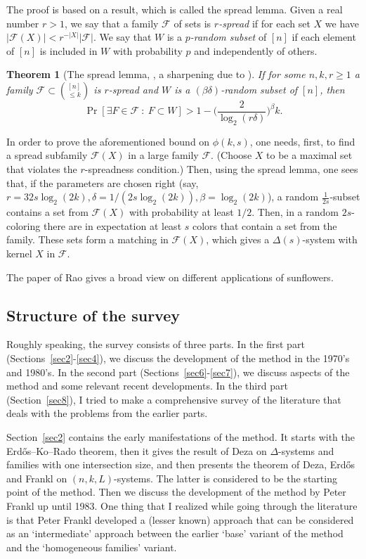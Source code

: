 \documentclass[graybox]{svmult}
\renewcommand{\le}{\leqslant}
\renewcommand{\ge}{\geqslant}
\newcommand{\ff}{\mathcal{F}}
\newtheorem{thm}{Theorem}
\begin{document}
The proof is based on a result, which is called the spread lemma. Given a real number $r>1$, we say that a family $\ff$ of sets is {\it $r$-spread} if for each set $X$ we have $|\ff(X)|< r^{-|X|}|\ff|$. We say that $W$ is a {\it $p$-random subset} of $[n]$ if each element of $[n]$ is included in $W$ with probability $p$ and independently of others.

\begin{thm}[The spread lemma, \cite{Alw}, a sharpening due to \cite{Sto}]\label{thmtao}
  If for some $n,k,r\ge 1$ a family $\ff\subset {[n]\choose \le k}$ is $r$-spread and $W$ is a $(\beta\delta)$-random subset of $[n]$, then $$\Pr[\exists F\in \ff\ :\ F\subset W]> 1-\Big(\frac 2{\log_2(r\delta)} \Big)^\beta k.$$
\end{thm}
In order to prove the aforementioned bound on $\phi(k,s)$, one needs, first, to find a spread subfamily $\ff(X)$ in a large family $\ff$. (Choose $X$ to be a maximal set that violates the $r$-spreadness condition.) Then, using the spread lemma, one sees that, if the parameters are chosen right (say, $r=32s \log_2(2k), \delta = 1/(2s \log_2(2k)) ,\beta = \log_2 (2k)$), a random $\frac 1{2s}$-subset contains a set from $\ff(X)$ with probability at least $1/2$. Then, in a random $2s$-coloring there are in expectation at least $s$ colors that contain a set from the family. These sets form a matching in $\ff(X)$, which gives a $\Delta(s)$-system with kernel $X$ in $\ff$.

The paper of Rao \cite{Rao2} gives a broad view on different applications of sunflowers.

\subsection{Structure of the survey}
Roughly speaking, the survey consists of three parts. In the first part (Sections~\ref{sec2}-\ref{sec4}), we discuss the development of the method in the 1970's and 1980's. In the second part (Sections~\ref{sec6}-\ref{sec7}), we discuss aspects of the method and some relevant recent developments. In the third part (Section~\ref{sec8}), I tried to make a comprehensive survey of the literature that deals with the problems from the earlier parts.

Section~\ref{sec2} contains the early manifestations of the method. It starts with the Erd\H os--Ko--Rado theorem, then it gives the result of Deza on $\Delta$-systems and families with one intersection size, and then presents the theorem of Deza, Erd\H os and Frankl on $(n,k,L)$-systems. The latter is considered to be the starting point of the method. Then we discuss the development of the method  by Peter Frankl up until 1983. One thing that I realized while going through the literature is that Peter Frankl developed a (lesser known) approach that can be considered as an `intermediate' approach between the earlier `base' variant of the method and the `homogeneous families' variant.
\end{document}
